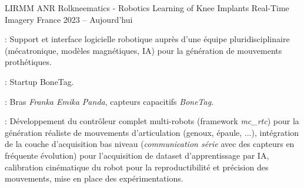 \begin{cventries}
  \cventry
    {LIRMM} %
    {ANR Rolkneematics - Robotics Learning of Knee Implants Real-Time Imagery} %
    {France} %
    {2023 -- Aujourd'hui} %
    {
      \begin{cvitems} 
        \item {} : Support et interface logicielle robotique auprès d'une équipe pluridisciplinaire (mécatronique, modèles magnétiques, IA) pour la génération de mouvements prothétiques.
        \item {} : Startup BoneTag.
        \item {} : Bras \emph{Franka Emika Panda}, capteurs capacitifs \emph{BoneTag}.
        \item {} : Développement du contrôleur complet multi-robots (framework \emph{mc\_rtc}) pour la génération réaliste de mouvements d'articulation (genoux, épaule, ...), intégration de la couche d'acquisition bas niveau (\emph{communication série} avec des capteurs en fréquente évolution) pour l'acquisition de dataset d'apprentissage par IA, calibration cinématique du robot pour la reproductibilité et précision des mouvements, mise en place des expérimentations.
      \end{cvitems}
    }


\end{cventries}
